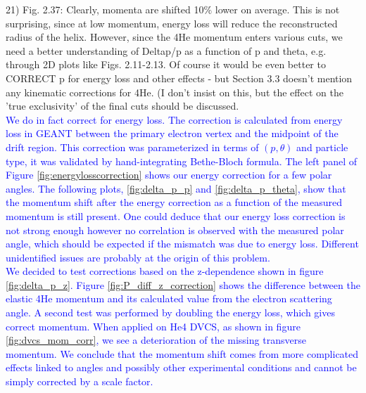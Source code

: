 21) Fig. 2.37: Clearly, momenta are shifted 10$\%$ lower on average. This is 
not surprising, since at low momentum, energy loss will reduce the 
reconstructed radius of the helix. However, since the 4He momentum enters 
various cuts, we need a better understanding of Deltap/p as a function of p and 
theta, e.g. through 2D plots like Figs. 2.11-2.13. Of course it would be even 
better to CORRECT p for energy loss and other effects - but Section 3.3 doesn't 
mention any kinematic corrections for 4He. (I don't insist on this, but the 
effect on the 'true exclusivity' of the final cuts should be discussed.\\  
\textcolor{blue}{We do in fact correct for energy loss. The correction is 
calculated from energy loss in GEANT between the primary electron vertex and
the midpoint of the drift region. This correction was parameterized in terms 
of $(p,\theta)$ and particle type, it was validated by hand-integrating 
Bethe-Bloch formula. The left panel of Figure \ref{fig:energylosscorrection} 
shows our energy correction for a few polar angles. 
The following plots, \ref{fig:delta_p_p} and \ref{fig:delta_p_theta}, 
show that the momentum shift after the energy correction 
as a function of the measured momentum is still present. One could deduce
that our energy loss correction is not strong enough however 
no correlation is observed with the measured polar angle, which
should be expected if the mismatch was due to energy loss. Different
unidentified issues are probably at the origin of this problem.}\\
\textcolor{blue}{We decided to test corrections based on the z-dependence shown
in figure \ref{fig:delta_p_z}. Figure \ref{fig:P_diff_z_correction} shows the 
difference between the elastic 4He momentum and its calculated value 
from the electron scattering 
angle. A second test was performed by doubling the energy loss, which gives 
correct momentum.  When applied on He4 DVCS, as shown in figure 
\ref{fig:dvcs_mom_corr}, we see a deterioration of the missing transverse 
momentum. We conclude that the momentum shift comes from more complicated 
effects linked to angles and possibly other experimental conditions and cannot 
be simply corrected
by a scale factor.}\\

